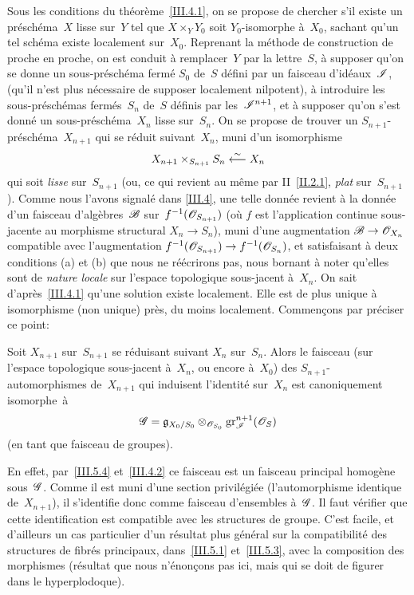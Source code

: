 Sous les conditions du th\'eor\`eme~\ref{III.4.1}, on se propose
de chercher s'il existe un pr\'esch\'ema~$X$ lisse sur~$Y$ tel que
$X\times_YY_0$ soit $Y_0$-isomorphe \`a~$X_0$, sachant qu'un tel
sch\'ema \og existe localement sur~$X_0$\fg. Reprenant la m\'ethode
de construction de proche en proche, on est conduit \`a
remplacer~$Y$ par la lettre~$S$, \`a supposer qu'on se donne un
sous-pr\'esch\'ema ferm\'e $S_0$ de~$S$ d\'efini par un
faisceau d'id\'eaux~$\cal{I}$, (qu'il n'est plus n\'ecessaire de
supposer localement nilpotent), \`a introduire les
sous-pr\'esch\'emas ferm\'es~$S_n$ de~$S$ d\'efinis par
les~$\cal{I}^{n+1}$, et \`a supposer qu'on s'est donn\'e un
sous-pr\'esch\'ema~$X_{n}$ lisse sur~$S_n$. On se propose de
trouver un $S_{n+1}$-pr\'esch\'ema~$X_{n+1}$ \og qui se r\'eduit
suivant~$X_{n}$\fg, \ie muni d'un isomorphisme
\begin{equation*}
X_{n+1}\times_{S_{n+1}}S_n\overset{\sim}{\longleftarrow} X_n
\end{equation*}
qui soit \emph{lisse} sur~$S_{n+1}$ (ou, ce qui revient au m\^eme
par II~\ref{II.2.1}, \emph{plat} sur~$S_{n+1}$). Comme nous l'avons
signal\'e dans \No \ref{III.4}, une telle donn\'ee revient \`a la
donn\'ee d'un faisceau d'alg\`ebres~$\cal{B}$ sur~$f^{-1}(\cal{O}_{S_{n+1}})$ (o\`u $f$ est l'application continue
sous-jacente au morphisme structural $X_n\to S_n$), muni d'une
augmentation $\cal{B}\to\cal{O}_{X_n}$ compatible avec l'augmentation
$f^{-1}(\cal{O}_{S_{n+1}})\to f^{-1}(\cal{O}_{S_n})$, et satisfaisant
\`a deux conditions (a) et (b) que nous ne r\'e\'ecrirons pas,
nous bornant \`a noter qu'elles sont de \emph{nature locale} sur
l'espace topologique sous-jacent \`a~$X_n$. On sait
d'apr\`es~\ref{III.4.1} qu'une solution existe localement. Elle est
de plus unique \`a isomorphisme (non unique) pr\`es, du moins
localement. Commen\c cons par pr\'eciser ce point:

\begin{proposition}
\label{III.6.1}
Soit
$X_{n+1}$ sur~$S_{n+1}$ se r\'eduisant suivant $X_n$
sur~$S_{n}$. Alors le faisceau (sur l'espace topologique sous-jacent
\`a~$X_{n}$, ou encore \`a~$X_0$) des $S_{n+1}$-automorphismes
de~$X_{n+1}$ qui induisent l'identit\'e sur~$X_n$ est canoniquement
isomorphe~\`a
\begin{equation*}
\cal{G}=\goth{g}_{X_0/S_0}\otimes_{\cal{O}_{S_0}}
\gr_{\cal{I}}^{n+1}(\cal{O}_S)
\end{equation*}
(en tant que faisceau de groupes).
\end{proposition}

En effet, par~\ref{III.5.4} et~\ref{III.4.2} ce faisceau est un
faisceau principal homog\`ene sous~$\cal{G}$. Comme il est muni
d'une section privil\'egi\'ee (l'automorphisme identique
de~$X_{n+1}$), il s'identifie donc comme faisceau d'ensembles
\`a~$\cal{G}$. Il faut v\'erifier que cette identification est
compatible avec les structures de groupe. C'est facile, et d'ailleurs
un cas particulier d'un r\'esultat plus g\'en\'eral sur la
compatibilit\'e des structures de fibr\'es principaux,
dans~\ref{III.5.1} et~\ref{III.5.3}, avec la composition des
morphismes (r\'esultat que nous n'\'enon\c cons pas ici, mais
qui se doit de figurer dans le hyperplodoque).

